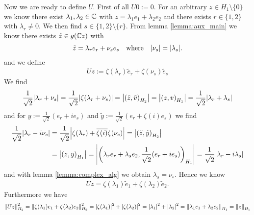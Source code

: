 \begin{example}
	Now we are ready to define $U$. First of all $U0 := 0$. For an arbitrary $z \in H_1 \setminus \{0\}$ we know there exist $\lambda_1, \lambda_2 \in \C$ with $z = \lambda_1 e_1 + \lambda_2 e_2$ and there exists $r \in \{1,2\}$ with $\lambda_r \neq 0$. We then find $s \in \{1, 2\} \setminus \{r\}$. From lemma \ref{lemma:aux_main} we know there exists $\tilde{z} \in g(\C z)$ with 
	\begin{align*}
		\tilde{z} = \lambda_r e_r + \nu_s e_s \quad \text{where} \quad \vbraces{\nu_s} = \vbraces{\lambda_s}.
	\end{align*}
	and we define
	\begin{align*}
		Uz := \zeta(\lambda_r) \tilde{e}_r + \zeta(\nu_s) \tilde{e}_s
	\end{align*}
	We find 
	\begin{align*}
		\frac{1}{\sqrt{2}} \vbraces{\lambda_r + \nu_s} = \frac{1}{\sqrt{2}} \vbraces{\zeta(\lambda_r + \nu_s)}= \vbraces{\pbraces{\tilde{z}, \tilde{v}}_{H_2}} = \vbraces{\pbraces{z, v}_{H_1}} = \frac{1}{\sqrt{2}} \vbraces{\lambda_r + \lambda_s}
	\end{align*}
	and for $y := \frac{1}{\sqrt{2}}(e_r + ie_s)$ and $\tilde{y} := \frac{1}{\sqrt{2}} (e_r + \zeta(i) e_s)$ we find
	\begin{align*}
		\frac{1}{\sqrt{2}}\vbraces{\lambda_r - i\nu_s} &= \frac{1}{\sqrt{2}} \vbraces{\zeta(\lambda_r) + \overline{\zeta(i)} \zeta(\nu_s)}= \vbraces{\pbraces{\tilde{z}, \tilde{y}}_{H_2}} \\
		&= \vbraces{\pbraces{z, y}_{H_1}} = \vbraces{\pbraces{\lambda_r e_r + \lambda_s e_2, \frac{1}{\sqrt{2}}(e_r + ie_s)}_{H_1}} = \frac{1}{\sqrt{2}} \vbraces{\lambda_r - i\lambda_s}
	\end{align*}
	and with lemma \ref{lemma:complex_alg} we obtain $\lambda_s = \nu_s$. Hence we know
	\begin{align*}
		Uz = \zeta(\lambda_1) \tilde{e}_1 + \zeta(\lambda_2) \tilde{e}_2.
	\end{align*}
	Furthermore we have
	\begin{align*}
		\norm[H_2]{Uz}^2 = \norm[H_2]{\zeta\pbraces{\lambda_1} e_1 + \zeta\pbraces{\lambda_2} e_2}^2 = \vbraces{\zeta\pbraces{\lambda_1}}^2 + \vbraces{\zeta\pbraces{\lambda_2}}^2 = \vbraces{\lambda_1}^2 + \vbraces{\lambda_2}^2 = \norm[H_1]{\lambda_1 e_1 + \lambda_2 e_2} = \norm[H_1]{z}
	\end{align*}
\end{example}


